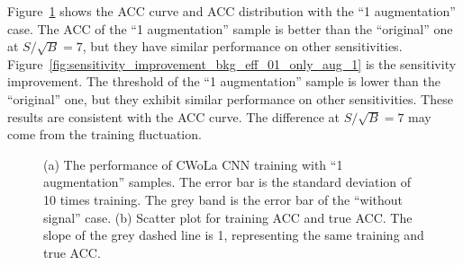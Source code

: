 \documentclass[12pt]{article}
\begin{document}
		Figure~\ref{fig:cwola_cnn_training_performance_only_aug_1} shows the ACC curve and ACC distribution with the ``1 augmentation'' case. The ACC of the ``1 augmentation'' sample is better than the ``original'' one at $S / \sqrt{B}=7$, but they have similar performance on other sensitivities. Figure~\ref{fig:sensitivity_improvement_bkg_eff_01_only_aug_1} is the sensitivity improvement. The threshold of the ``1 augmentation'' sample is lower than the ``original'' one, but they exhibit similar performance on other sensitivities. These results are consistent with the ACC curve. The difference at $S / \sqrt{B}=7$ may come from the training fluctuation. 
		\begin{figure}[htpb]
			\centering
			\caption{(a) The performance of CWoLa CNN training with ``1 augmentation'' samples. The error bar is the standard deviation of 10 times training. The grey band is the error bar of the ``without signal'' case. (b) Scatter plot for training ACC and true ACC. The slope of the grey dashed line is 1, representing the same training and true ACC.}
			\label{fig:cwola_cnn_training_performance_only_aug_1}
		\end{figure}
\end{document}
